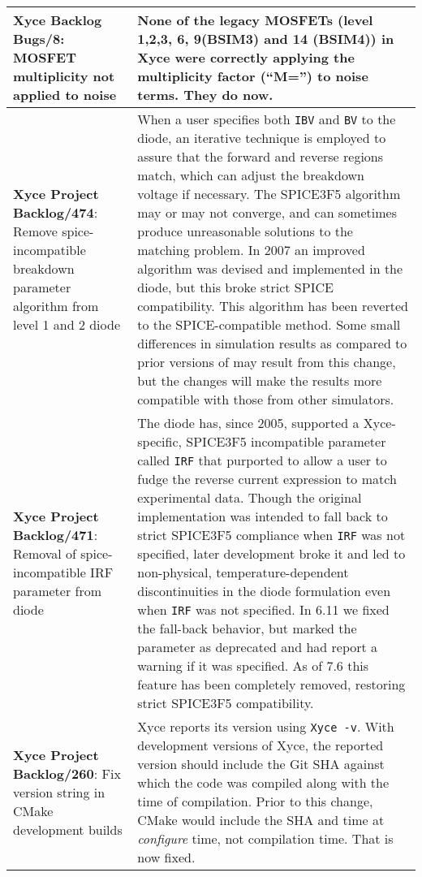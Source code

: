 {\begin{longtable}[h] {>{\raggedright\small}m{2in}|>{\raggedright\let\\\tabularnewline\small}m{3.5in}}
\textbf{Xyce Backlog Bugs/8}: MOSFET multiplicity not applied to noise &
None of the legacy MOSFETs (level 1,2,3, 6, 9(BSIM3) and 14 (BSIM4))
in Xyce were correctly applying the multiplicity factor (``M='') to
noise terms.  They do now. \\ \hline

\textbf{Xyce Project Backlog/474}: Remove spice-incompatible breakdown parameter algorithm from level 1 and 2 diode &
When a user specifies both \texttt{IBV} and \texttt{BV} to the diode,
an iterative technique is employed to assure that the forward and
reverse regions match, which can adjust the breakdown voltage if
necessary.  The SPICE3F5 algorithm may or may not converge, and can
sometimes produce unreasonable solutions to the matching problem.  In
2007 an improved algorithm was devised and implemented in the \Xyce{}
diode, but this broke strict SPICE compatibility.  This algorithm has
been reverted to the SPICE-compatible method.  Some small differences
in simulation results as compared to prior versions of \Xyce{} may
result from this change, but the changes will make the results more
compatible with those from other simulators.  \\ \hline

\textbf{Xyce Project Backlog/471}: Removal of spice-incompatible IRF parameter from diode &
The \Xyce{} diode has, since 2005, supported a Xyce-specific, SPICE3F5
incompatible parameter called \texttt{IRF} that purported to allow a
user to fudge the reverse current expression to match experimental
data.  Though the original implementation was intended to fall back to
strict SPICE3F5 compliance when \texttt{IRF} was not specified, later
development broke it and led to non-physical, temperature-dependent
discontinuities in the diode formulation even when \texttt{IRF} was
not specified.  In \Xyce{} 6.11 we fixed the fall-back behavior, but
marked the parameter as deprecated and had \Xyce{} report a warning if
it was specified.  As of \Xyce{} 7.6 this feature has been completely
removed, restoring strict SPICE3F5 compatibility. \\ \hline

\textbf{Xyce Project Backlog/260}: Fix version string in CMake development builds &
Xyce reports its version using \texttt{Xyce -v}.  With development versions of
Xyce, the reported version should include the Git SHA against which the code
was compiled along with the time of compilation. Prior to this change, CMake
would include the SHA and time at \emph{configure} time, not compilation time.
That is now fixed. \\ \hline


\end{longtable}}

